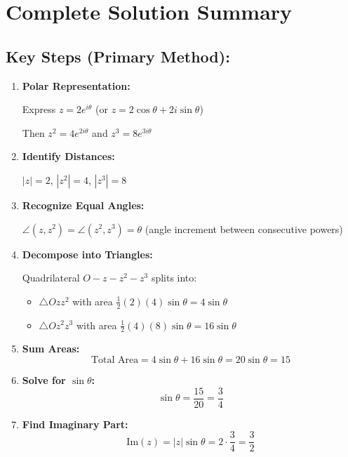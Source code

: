 \documentclass[12pt]{article}
\begin{document}
\newpage

\section*{Complete Solution Summary}

\subsection*{Key Steps (Primary Method):}

\begin{enumerate}
    \item \textbf{Polar Representation:} 
    
    Express $z = 2e^{i\theta}$ (or $z = 2\cos\theta + 2i\sin\theta$)
    
    Then $z^2 = 4e^{2i\theta}$ and $z^3 = 8e^{3i\theta}$
    
    \item \textbf{Identify Distances:}
    
    $|z| = 2$, $|z^2| = 4$, $|z^3| = 8$
    
    \item \textbf{Recognize Equal Angles:}
    
    $\angle(z, z^2) = \angle(z^2, z^3) = \theta$ (angle increment between consecutive powers)
    
    \item \textbf{Decompose into Triangles:}
    
    Quadrilateral $O - z - z^2 - z^3$ splits into:
    \begin{itemize}
        \item $\triangle Ozz^2$ with area $\frac{1}{2}(2)(4)\sin\theta = 4\sin\theta$
        \item $\triangle Oz^2z^3$ with area $\frac{1}{2}(4)(8)\sin\theta = 16\sin\theta$
    \end{itemize}
    
    \item \textbf{Sum Areas:}
    \[
    \text{Total Area} = 4\sin\theta + 16\sin\theta = 20\sin\theta = 15
    \]
    
    \item \textbf{Solve for $\sin\theta$:}
    \[
    \sin\theta = \frac{15}{20} = \frac{3}{4}
    \]
    
    \item \textbf{Find Imaginary Part:}
    \[
    \text{Im}(z) = |z|\sin\theta = 2 \cdot \frac{3}{4} = \frac{3}{2}
    \]
\end{enumerate}
\end{document}
